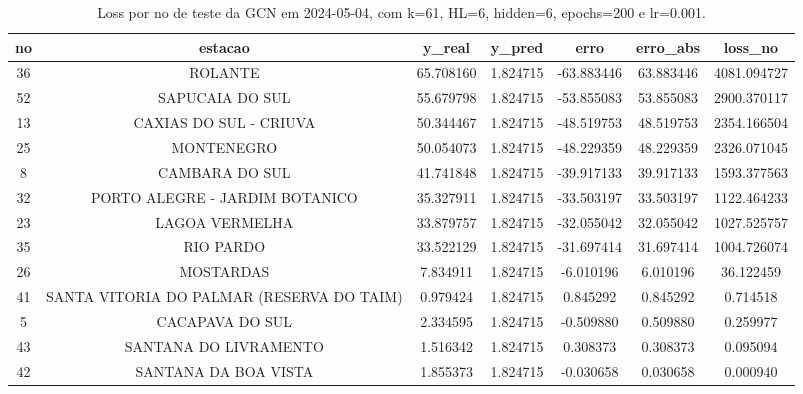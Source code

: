 \begin{table}[h]
\centering
\caption{Loss por no de teste da GCN em 2024-05-04, com k=61, HL=6, hidden=6, epochs=200 e lr=0.001.}
\label{tab:gcn_loss_k61_hl6_h6_e200_d20240504}
\begin{tabular}{ccccccc}
\toprule
no & estacao & y\_real & y\_pred & erro & erro\_abs & loss\_no \\
\midrule
36 & ROLANTE & 65.708160 & 1.824715 & -63.883446 & 63.883446 & 4081.094727 \\
52 & SAPUCAIA DO SUL & 55.679798 & 1.824715 & -53.855083 & 53.855083 & 2900.370117 \\
13 & CAXIAS DO SUL - CRIUVA & 50.344467 & 1.824715 & -48.519753 & 48.519753 & 2354.166504 \\
25 & MONTENEGRO & 50.054073 & 1.824715 & -48.229359 & 48.229359 & 2326.071045 \\
8 & CAMBARA DO SUL & 41.741848 & 1.824715 & -39.917133 & 39.917133 & 1593.377563 \\
32 & PORTO ALEGRE - JARDIM BOTANICO & 35.327911 & 1.824715 & -33.503197 & 33.503197 & 1122.464233 \\
23 & LAGOA VERMELHA & 33.879757 & 1.824715 & -32.055042 & 32.055042 & 1027.525757 \\
35 & RIO PARDO & 33.522129 & 1.824715 & -31.697414 & 31.697414 & 1004.726074 \\
26 & MOSTARDAS & 7.834911 & 1.824715 & -6.010196 & 6.010196 & 36.122459 \\
41 & SANTA VITORIA DO PALMAR (RESERVA DO TAIM) & 0.979424 & 1.824715 & 0.845292 & 0.845292 & 0.714518 \\
5 & CACAPAVA DO SUL & 2.334595 & 1.824715 & -0.509880 & 0.509880 & 0.259977 \\
43 & SANTANA DO LIVRAMENTO & 1.516342 & 1.824715 & 0.308373 & 0.308373 & 0.095094 \\
42 & SANTANA DA BOA VISTA & 1.855373 & 1.824715 & -0.030658 & 0.030658 & 0.000940 \\
\bottomrule
\end{tabular}
\end{table}
